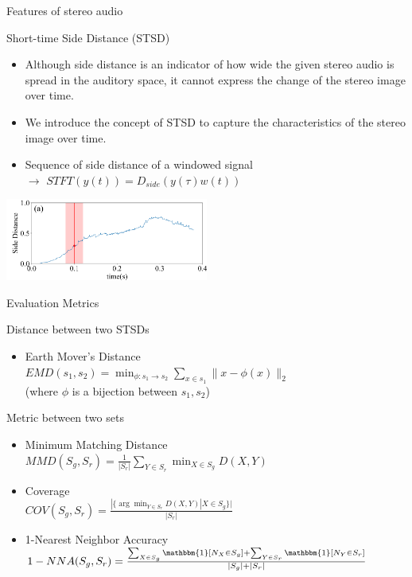 \begin{frame}{Features of stereo audio}
    \begin{block}{Short-time Side Distance (STSD)}
        \begin{itemize}
            \item Although side distance is an indicator of how wide the given stereo audio is spread in the auditory space, it cannot express the change of the stereo image over time.
            \item We introduce the concept of STSD to capture the characteristics of the stereo image over time.
            \item Sequence of side distance of a windowed signal\\
            $\rightarrow$ $STFT(y(t)) = D_{side}(y(\tau)w(t))$
        \end{itemize}
        \bigskip
        \centering
        \includegraphics[width=0.5\textwidth]{Presentation/figures/stsd_ppt.png}
    \end{block}
\end{frame}

\begin{frame}{Evaluation Metrics}
    \begin{block}{Distance between two STSDs}
        \begin{itemize}
            \item Earth Mover's Distance\\
            $EMD(s_1, s_2) = \min_{\phi: s_1\to s_2} \sum_{x\in s_1} \|x-\phi(x)\|_2$\\
            (where $\phi$ is a bijection between $s_1, s_2$)
        \end{itemize}
    \end{block}
    \begin{block}{Metric between two sets}
        \begin{itemize}
            \item Minimum Matching Distance\\
            $MMD(S_g, S_r) = \frac{1}{|S_r|}\sum_{Y\in S_r} \min_{X\in S_g}D(X,Y)$
            \item Coverage\\
            $COV(S_g, S_r) = \frac{|\{\arg\min_{Y \in S_r} D(X,Y) | X \in S_g \}|}{|S_r|}$
            \item 1-Nearest Neighbor Accuracy\\
            $1-NNA(S_g, S_r) = \frac{\sum_{X\in S_g} \mathbbm{1}[N_X \in S_g] +  \sum_{Y\in S_r} \mathbbm{1}[N_Y \in S_r]}{|S_g|+|S_r|}$
        \end{itemize}
    \end{block}
\end{frame}
